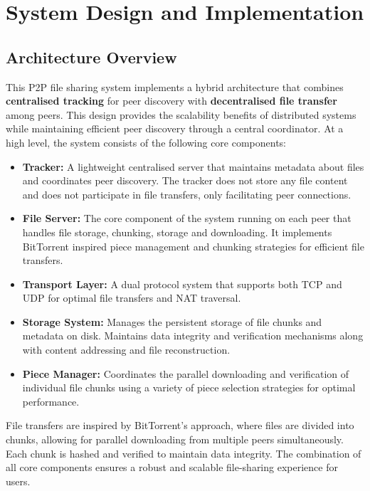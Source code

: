 \documentclass[12pt,a4paper]{report}
\begin{document}
\chapter{System Design and Implementation}
\section{Architecture Overview}

This P2P file sharing system implements a hybrid architecture that combines \textbf{centralised tracking} for peer discovery with \textbf{decentralised file transfer} among peers. This design provides the scalability benefits of distributed systems while maintaining efficient peer discovery through a central coordinator. At a high level, the system consists of the following core components:

\begin{itemize}
	\item \textbf{Tracker:} A lightweight centralised server that maintains metadata about files and coordinates peer discovery. The tracker does not store any file content and does not participate in file transfers, only facilitating peer connections.
	\item \textbf{File Server:} The core component of the system running on each peer that handles file storage, chunking, storage and downloading. It implements BitTorrent inspired piece management and chunking strategies for efficient file transfers.
	\item \textbf{Transport Layer:} A dual protocol system that supports both TCP and UDP for optimal file transfers and NAT traversal.
	\item \textbf{Storage System:} Manages the persistent storage of file chunks and metadata on disk. Maintains data integrity and verification mechanisms along with content addressing and file reconstruction.
	\item \textbf{Piece Manager:} Coordinates the parallel downloading and verification of individual file chunks using a variety of piece selection strategies for optimal performance.
\end{itemize}

File transfers are inspired by BitTorrent's approach, where files are divided into chunks, allowing for parallel downloading from multiple peers simultaneously. Each chunk is hashed and verified to maintain data integrity. The combination of all core components ensures a robust and scalable file-sharing experience for users.
\end{document}
